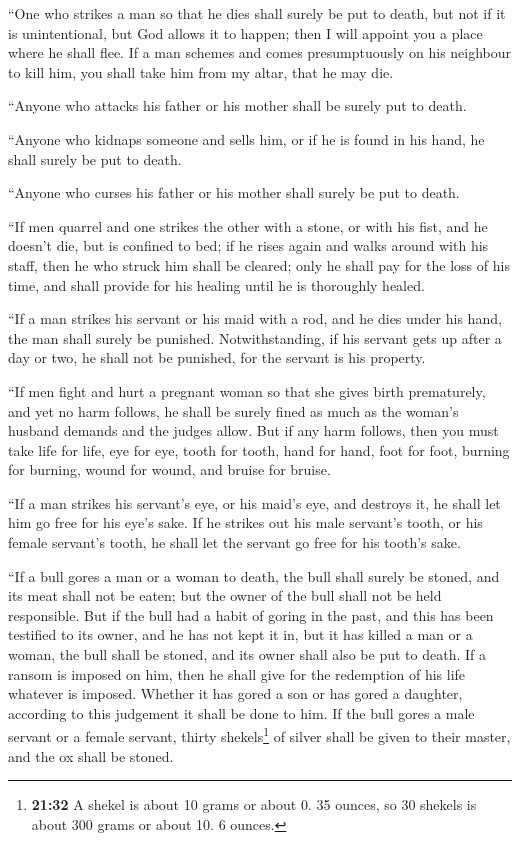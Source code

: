  ``One who strikes a man so that he dies shall surely be
put to death,  but not if it is unintentional, but God
allows it to happen; then I will appoint you a place where he shall
flee.  If a man schemes and comes presumptuously on his
neighbour to kill him, you shall take him from my altar, that he may
die.

 ``Anyone who attacks his father or his mother shall be
surely put to death.

 ``Anyone who kidnaps someone and sells him, or if he is
found in his hand, he shall surely be put to death.

 ``Anyone who curses his father or his mother shall
surely be put to death.

 ``If men quarrel and one strikes the other with a stone,
or with his fist, and he doesn't die, but is confined to bed;
 if he rises again and walks around with his staff, then
he who struck him shall be cleared; only he shall pay for the loss of
his time, and shall provide for his healing until he is thoroughly
healed.

 ``If a man strikes his servant or his maid with a rod,
and he dies under his hand, the man shall surely be punished.
 Notwithstanding, if his servant gets up after a day or
two, he shall not be punished, for the servant is his property.

 ``If men fight and hurt a pregnant woman so that she
gives birth prematurely, and yet no harm follows, he shall be surely
fined as much as the woman's husband demands and the judges allow.
 But if any harm follows, then you must take life for
life,  eye for eye, tooth for tooth, hand for hand, foot
for foot,  burning for burning, wound for wound, and
bruise for bruise.

 ``If a man strikes his servant's eye, or his maid's eye,
and destroys it, he shall let him go free for his eye's sake.
 If he strikes out his male servant's tooth, or his
female servant's tooth, he shall let the servant go free for his tooth's
sake.

 ``If a bull gores a man or a woman to death, the bull
shall surely be stoned, and its meat shall not be eaten; but the owner
of the bull shall not be held responsible.  But if the
bull had a habit of goring in the past, and this has been testified to
its owner, and he has not kept it in, but it has killed a man or a
woman, the bull shall be stoned, and its owner shall also be put to
death.  If a ransom is imposed on him, then he shall give
for the redemption of his life whatever is imposed. 
Whether it has gored a son or has gored a daughter, according to this
judgement it shall be done to him.  If the bull gores a
male servant or a female servant, thirty shekels\footnote{\textbf{21:32}
  A shekel is about 10 grams or about 0. 35 ounces, so 30 shekels is
  about 300 grams or about 10. 6 ounces.} of silver shall be given to
their master, and the ox shall be stoned.

